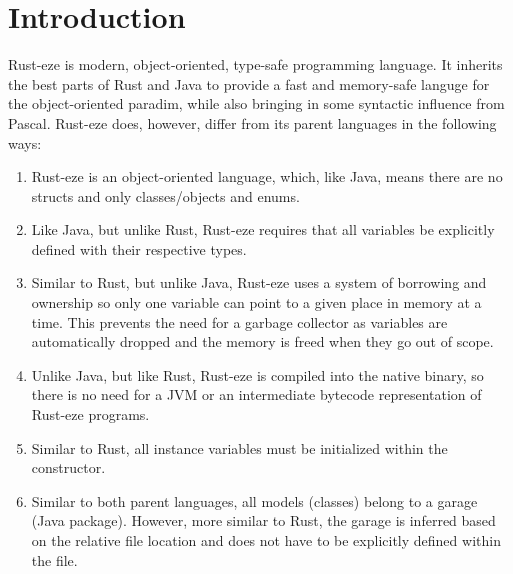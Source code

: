 \documentclass[letterpaper, 10pt, DIV=13]{scrartcl}
\numberwithin{equation}{section}
\numberwithin{figure}{section}
\numberwithin{table}{section}
\begin{document}
\section{Introduction}
Rust-eze is modern, object-oriented, type-safe programming language. It inherits
the best parts of Rust and Java to provide a fast and memory-safe languge for
the object-oriented paradim, while also bringing in some syntactic influence from Pascal.
Rust-eze does, however, differ from its parent languages in the following ways:
\begin{enumerate}
    \item Rust-eze is an object-oriented language, which, like Java, means there
          are no structs and only classes/objects and enums.
    \item Like Java, but unlike Rust, Rust-eze requires that all
          variables be explicitly defined with their respective types.
    \item Similar to Rust, but unlike Java, Rust-eze uses a system of borrowing
          and ownership so only one variable can point to a given place in
          memory at a time. This prevents the need for a garbage collector as
          variables are automatically dropped and the memory is freed when they
          go out of scope.
    \item Unlike Java, but like Rust, Rust-eze is compiled into the native
          binary, so there is no need for a JVM or an intermediate bytecode
          representation of Rust-eze programs.
    \item Similar to Rust, all instance variables must be initialized within the
          constructor.
    \item Similar to both parent languages, all models (classes) belong to a garage
          (Java package). However, more similar to Rust, the garage is inferred
          based on the relative file location and does not have to be explicitly
          defined within the file.
\end{enumerate}

\newpage
\end{document}
